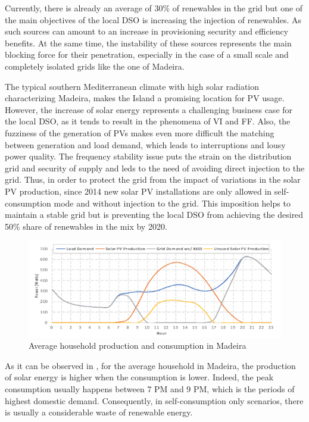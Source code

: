 Currently, there is already an average of 30\% of renewables in the grid but one of the main objectives of the local \ac{DSO} is increasing the injection of renewables. As such sources can amount to an increase in provisioning security and efficiency benefits. At the same time, the instability of these sources represents the main blocking force for their penetration, especially in the case of a small scale and completely isolated grids like the one of Madeira.


The typical southern Mediterranean climate with high solar radiation characterizing Madeira, makes the Island a promising location for \ac{PV} usage. However, the increase of solar energy represents a challenging business case for the local \ac{DSO}, as it tends to result in the phenomena of \ac{VI} and \ac{FF}. Also, the fuzziness of the generation of \acp{PV} makes even more difficult the matching between generation and load demand, which leads to interruptions and lousy power quality. The frequency stability issue puts the strain on the distribution grid and security of supply and leds to the need of avoiding direct injection to the grid. Thus, in order to protect the grid from the impact of variations in the solar \ac{PV} production, since 2014 new solar \ac{PV} installations are only allowed in self-consumption mode and without injection to the grid. This imposition helps to maintain a stable grid but is preventing the local \ac{DSO} from achieving the desired 50\% share of renewables in the mix by 2020.


\begin{figure}[h]
\centering
\includegraphics[width=1\textwidth]{./Images/grafico_intro}
\caption{Average household production and consumption in Madeira}
\label{fig:graph_intro}
\end{figure}

As it can be observed in , for the average household in Madeira, the production of solar energy is higher when the consumption is lower. Indeed, the peak consumption usually happens between 7 PM and 9 PM, which is the periods of highest domestic demand. Consequently, in self-consumption only scenarios, there is usually a considerable waste of renewable energy. 


